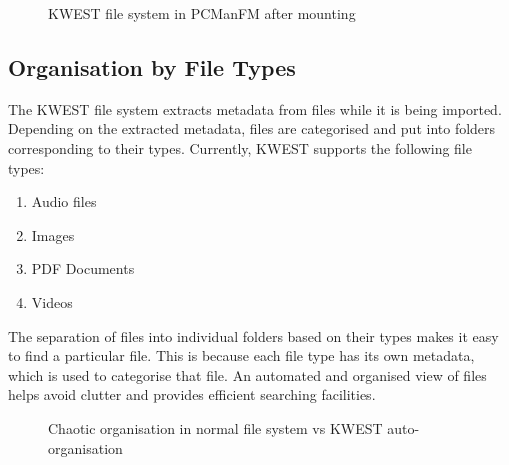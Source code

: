 \begin{figure}[htb]
\centering
\setlength\fboxsep{0pt}
\setlength\fboxrule{0.5pt}
\caption{KWEST file system in PCManFM after mounting}
\label{fig:dfd0}
\end{figure}
\newpage
\subsection{Organisation by File Types}
The KWEST file system extracts metadata from files while it is being imported. Depending on the extracted metadata, files are categorised and put into folders corresponding to their types. Currently, KWEST supports the following file types:
\begin{enumerate}
\item Audio files
\item Images
\item PDF Documents
\item Videos
\end{enumerate}
The separation of files into individual folders based on their types makes it easy to find a particular file. This is because each file type has its own metadata, which is used to categorise that file. An automated and organised view of files helps avoid clutter and provides efficient searching facilities.
\begin{figure}[htb]
\centering
\setlength\fboxsep{0pt}
\setlength\fboxrule{0.5pt}
\caption{Chaotic organisation in normal file system vs KWEST auto-organisation}
\label{fig:dfd0}
\end{figure}

